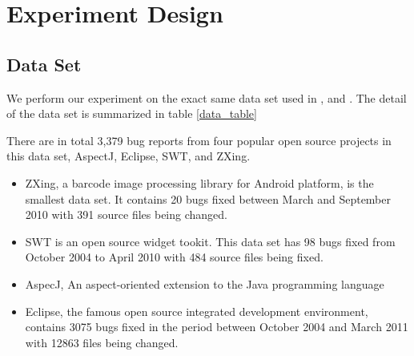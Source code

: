 %
%
%


 
\section{Experiment Design}

\subsection{Data Set }
We perform our experiment on the exact same data set used in \cite{wang2014version} ,\cite{saha2013improving} and \cite{zhou2012should}.
The detail of the data set is summarized in table \ref{data_table} 


There are in total 3,379 bug reports from four popular open source projects in this data set, AspectJ, Eclipse, SWT, and ZXing. 
\begin{itemize}
	\item ZXing, a barcode image processing library for Android platform, is the smallest data set.
	It contains 20 bugs fixed between March and September 2010 with 391 source files being changed.
	\item SWT is an open source widget tookit. 
	This data set has 98 bugs fixed from October 2004 to April 2010 with 484 source files being fixed. 
	\item AspecJ, An aspect-oriented extension to the Java programming language 
	\item Eclipse, the famous open source integrated development environment, contains 3075 bugs fixed in the period between October 2004 and March 2011 with 12863 files being changed.
\end{itemize}





